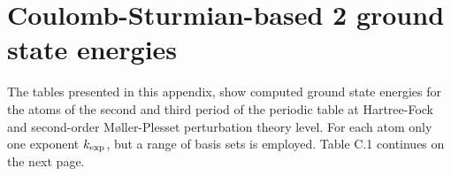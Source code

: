 \chapter{Coulomb-Sturmian-based {\MP}2 ground state energies}
\label{apx:CSCorrelationConvergence}


%	

The tables presented in this appendix,
show computed ground state energies for the atoms of the second
and third period of the periodic table
at Hartree-Fock and second-order Møller-Plesset perturbation theory level.
For each atom only one \CS exponent $k_\text{exp}$,
but a range of \CS basis sets is employed.
Table C.1 continues on the next page.

\hfill


\begin{landscape}


\end{landscape}
